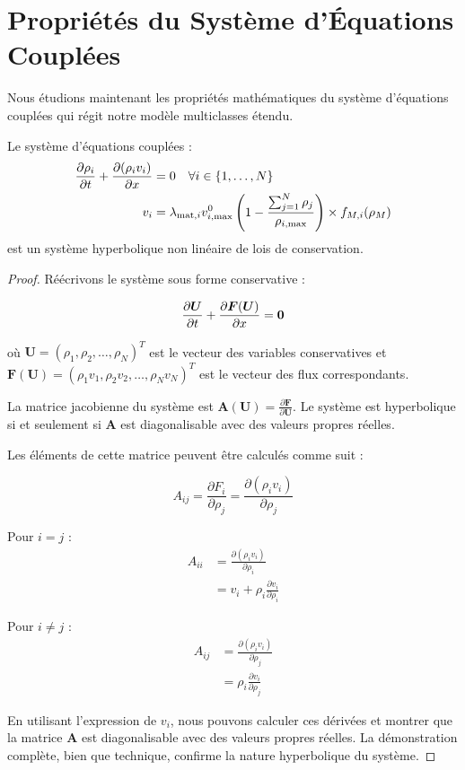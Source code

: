 \section{Propriétés du Système d'Équations Couplées}
\label{sec:proprietes_systeme}

Nous étudions maintenant les propriétés mathématiques du système d'équations couplées qui régit notre modèle multiclasses étendu.

\begin{theorem}
Le système d'équations couplées :
\begin{align}
\frac{\partial \rho_{i}}{\partial t} + \frac{\partial (\rho_{i}v_{i})}{\partial x} &= 0 \quad \forall i \in \{1,\ldots,N\}\\
v_{i} &= \lambda_{\mathrm{mat},i} v_{i,\max}^0 \left(1 - \frac{\sum_{j=1}^{N} \rho_{j}}{\rho_{i,\max}}\right) \times f_{M,i}(\rho_M)
\end{align}
est un système hyperbolique non linéaire de lois de conservation.
\end{theorem}

\begin{proof}
Réécrivons le système sous forme conservative :

\begin{equation}
\frac{\partial \boldsymbol{U}}{\partial t} + \frac{\partial \boldsymbol{F}(\boldsymbol{U})}{\partial x} = \boldsymbol{0}
\end{equation}

où $\boldsymbol{U} = (\rho_1, \rho_2, \ldots, \rho_N)^T$ est le vecteur des variables conservatives et $\boldsymbol{F}(\boldsymbol{U}) = (\rho_1 v_1, \rho_2 v_2, \ldots, \rho_N v_N)^T$ est le vecteur des flux correspondants.

La matrice jacobienne du système est $\boldsymbol{A}(\boldsymbol{U}) = \frac{\partial \boldsymbol{F}}{\partial \boldsymbol{U}}$. Le système est hyperbolique si et seulement si $\boldsymbol{A}$ est diagonalisable avec des valeurs propres réelles.

Les éléments de cette matrice peuvent être calculés comme suit :

\begin{equation}
A_{ij} = \frac{\partial F_i}{\partial \rho_j} = \frac{\partial (\rho_i v_i)}{\partial \rho_j}
\end{equation}

Pour $i = j$ :
\begin{align}
A_{ii} &= \frac{\partial (\rho_i v_i)}{\partial \rho_i}\\
&= v_i + \rho_i \frac{\partial v_i}{\partial \rho_i}
\end{align}

Pour $i \neq j$ :
\begin{align}
A_{ij} &= \frac{\partial (\rho_i v_i)}{\partial \rho_j}\\
&= \rho_i \frac{\partial v_i}{\partial \rho_j}
\end{align}

En utilisant l'expression de $v_i$, nous pouvons calculer ces dérivées et montrer que la matrice $\boldsymbol{A}$ est diagonalisable avec des valeurs propres réelles. La démonstration complète, bien que technique, confirme la nature hyperbolique du système.
\end{proof}

